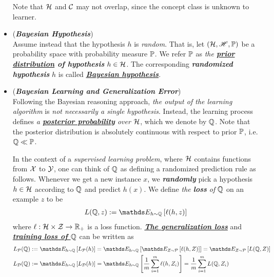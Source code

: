 \documentclass[11pt]{article}
\begin{document}
\begin{itemize}
\begin{definition}
Note that ${\mathcal H}$ and ${\mathcal C}$ may not overlap, since the concept class is unknown to learner. 
\end{definition}

\item  \begin{definition} (\emph{\textbf{Bayesian Hypothesis}})\\
Assume instead that the hypothesis $h$ is \emph{random}. That is, let $({\mathcal H}, {\mathscr H}, {\mathbb P})$ be a probability space with probability measure ${\mathbb P}$. We refer ${\mathbb P}$ as \emph{the \textbf{\underline{prior distribution} of hypothesis}} $h \in {\mathcal H}$. The corresponding \emph{\textbf{randomized hypothesis}} $h$ is called \underline{\emph{\textbf{Bayesian hypothesis}}}.
\end{definition}



\item \begin{definition}(\textbf{\emph{Bayesian Learning and Generalization Error}})\\
Following the Bayesian reasoning approach, \emph{the output of the learning algorithm} is \emph{not necessarily a single hypothesis}. Instead, the learning
process defines \emph{a \textbf{\underline{posterior probability}} over ${\mathcal H}$}, which we denote by ${\mathbb Q}$. Note that the posterior distribution is absolutely continuous with respect to prior ${\mathbb P}$, i.e. ${\mathbb Q} \ll {\mathbb P}$. 

In the context of a \emph{supervised learning problem}, where ${\mathcal H}$ contains functions from ${\mathcal X}$ to ${\mathcal Y}$, one can think of ${\mathbb Q}$ as defining a randomized prediction rule as follows.  Whenever we get a new instance $x$, we \emph{\textbf{randomly}} pick a hypothesis $h \in {\mathcal H}$ according to ${\mathbb Q}$ and predict $h(x)$. We define \emph{the \textbf{loss} of} ${\mathbb Q}$ on an example $z$ to be
\begin{align}
L(\bQ, z) := \E{h \sim \bQ}{\ell(h, z)} \label{def: bayesian_hypothesis_loss}
\end{align} where $\ell: {\mathcal H} \times {\mathcal Z} \to {\mathbb R}_{+}$ is a loss function. \underline{\emph{\textbf{The generalization loss}}} and \underline{\emph{\textbf{training loss of ${\mathbb Q}$}}} can be written as
\begin{align}
L_{\cP}(\bQ)& := \E{h \sim \bQ}{L_{\cP}(h)} =  \E{h \sim \bQ}{\E{Z \sim \cP}{\ell(h, Z)}}  = \E{Z \sim \cP}{L(\bQ, Z)}\label{def: bayesian_hypothesis_generalization_error}\\
L_{\cD}(\bQ)& :=\E{h \sim \bQ}{L_{\cD}(h)} =  \E{h \sim \bQ}{\frac{1}{m}\sum_{i=1}^{m}\ell(h, Z_i)} =  \frac{1}{m}\sum_{i=1}^{m}L(\bQ, Z_i) \label{def: bayesian_hypothesis_training_error}
\end{align}
\end{definition}
\end{itemize}
\end{document}
